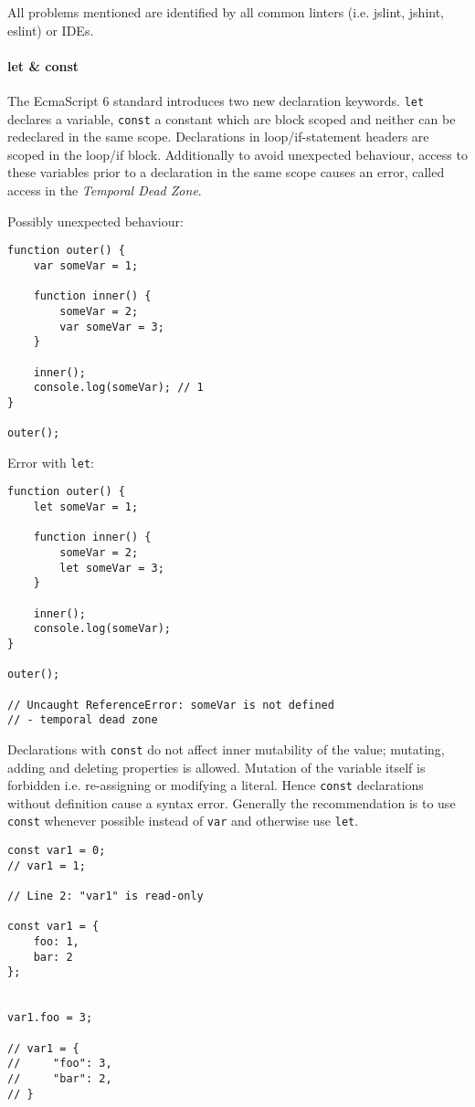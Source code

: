\documentclass{bioinfo}
\begin{document}
All problems mentioned are identified by all common linters (i.e. jslint, jshint, eslint)
or IDEs.


\paragraph{let \& const\textcolon}
The EcmaScript 6 standard introduces two new declaration keywords. {\tt let} declares
a variable, {\tt const} a constant which are block scoped and neither can be redeclared
in the same scope. Declarations in loop/if-statement headers are scoped in the loop/if
block. Additionally to avoid unexpected behaviour, access to these variables prior
to a declaration in the same scope causes an error, called access in
the {\em Temporal Dead Zone}.

\vfill\break

Possibly unexpected behaviour:
\begin{lstlisting}
function outer() {
    var someVar = 1;

    function inner() {
        someVar = 2;
        var someVar = 3;
    }

    inner();
    console.log(someVar); // 1
}

outer();
\end{lstlisting}

Error with {\tt let}:
\begin{lstlisting}
function outer() {
    let someVar = 1;

    function inner() {
        someVar = 2;
        let someVar = 3;
    }

    inner();
    console.log(someVar);
}

outer();

// Uncaught ReferenceError: someVar is not defined
// - temporal dead zone
\end{lstlisting}

Declarations with {\tt const} do not affect inner mutability of the value;
mutating, adding and deleting properties is allowed. Mutation of the variable
itself is forbidden i.e. re-assigning or modifying a literal. Hence {\tt const}
declarations without definition cause a syntax error. Generally the recommendation
is to use {\tt const} whenever possible instead of {\tt var} and otherwise use {\tt let}.

\vfill\break

\begin{lstlisting}
const var1 = 0;
// var1 = 1;

// Line 2: "var1" is read-only

const var1 = {
    foo: 1,
    bar: 2
};


var1.foo = 3;

// var1 = {
//     "foo": 3,
//     "bar": 2,
// }
\end{lstlisting}
\end{document}
